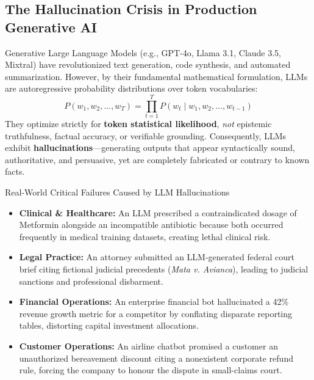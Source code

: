 \documentclass[11pt,a4paper]{article}
\begin{document}
\subsection{The Hallucination Crisis in Production Generative AI}
Generative Large Language Models (e.g., GPT-4o, Llama 3.1, Claude 3.5, Mixtral) have revolutionized text generation, code synthesis, and automated summarization. However, by their fundamental mathematical formulation, LLMs are autoregressive probability distributions over token vocabularies:
\begin{equation}
P(w_1, w_2, \dots, w_T) = \prod_{t=1}^T P(w_t \mid w_1, w_2, \dots, w_{t-1})
\end{equation}
They optimize strictly for \textbf{token statistical likelihood}, \textit{not} epistemic truthfulness, factual accuracy, or verifiable grounding. Consequently, LLMs exhibit \textbf{hallucinations}---generating outputs that appear syntactically sound, authoritative, and persuasive, yet are completely fabricated or contrary to known facts.

\begin{alertbox}{Real-World Critical Failures Caused by LLM Hallucinations}
\begin{itemize}[leftmargin=*]
    \item \textbf{Clinical \& Healthcare:} An LLM prescribed a contraindicated dosage of Metformin alongside an incompatible antibiotic because both occurred frequently in medical training datasets, creating lethal clinical risk.
    \item \textbf{Legal Practice:} An attorney submitted an LLM-generated federal court brief citing fictional judicial precedents (\textit{Mata v. Avianca}), leading to judicial sanctions and professional disbarment.
    \item \textbf{Financial Operations:} An enterprise financial bot hallucinated a 42\% revenue growth metric for a competitor by conflating disparate reporting tables, distorting capital investment allocations.
    \item \textbf{Customer Operations:} An airline chatbot promised a customer an unauthorized bereavement discount citing a nonexistent corporate refund rule, forcing the company to honour the dispute in small-claims court.
\end{itemize}
\end{alertbox}
\end{document}
